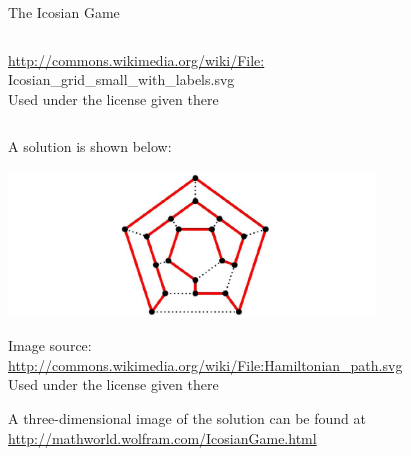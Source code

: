 \documentclass[smaller,hyperref={CJKbookmarks=true}]{beamer}
\begin{document}
\begin{frame}{The Icosian Game}
\begin{spacing}{1.05}
\begin{columns}[onlytextwidth]
\begin{column}{0.5\textwidth}
\begin{center}
\begin{spacing}{0.5}
\begin{tiny}
\url{http://commons.wikimedia.org/wiki/File:}\\
Icosian\_grid\_small\_with\_labels.svg\\
Used under the license given there
\end{tiny}
\end{spacing}
\end{center}
\end{column}
\end{columns}
\newpage
A solution is shown below:\\
\begin{center}
\begin{spacing}{0.5}
\includegraphics[width=\textwidth,height=110pt]{pent3.jpg}
\begin{tiny}
Image source:\\
\url{http://commons.wikimedia.org/wiki/File:Hamiltonian\_path.svg}\\
Used under the license given there
\end{tiny}
\end{spacing}
\end{center}
A three-dimensional image of the solution can be found at \url{http://mathworld.wolfram.com/IcosianGame.html}
\end{spacing}
\end{frame}
\end{document}
